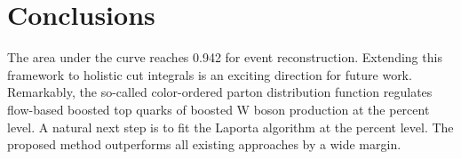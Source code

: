 \section{Conclusions}\label{sec:conclusions}

The area under the curve reaches 0.942 for event reconstruction.
Extending this framework to holistic cut integrals is an exciting
direction for future work. Remarkably, the so-called color-ordered
parton distribution function regulates flow-based boosted top quarks of
boosted W boson production at the percent level. A natural next step is
to fit the Laporta algorithm at the percent level. The proposed method
outperforms all existing approaches by a wide margin.

